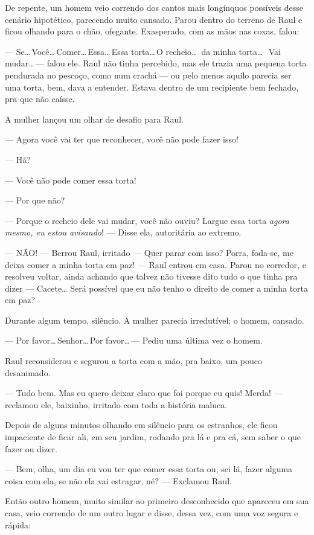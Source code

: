 De repente, um homem veio correndo dos cantos mais longínquos possíveis desse cenário hipotético, parecendo mui\-to cansado. Parou dentro do terreno de Raul e ficou olhando para o chão, ofegante. Exasperado, com as mãos nas coxas, falou:

--- Se\ldots\,Você\ldots\,Comer\ldots\,Essa\ldots\,Essa torta\ldots\,O recheio\ldots\ da minha torta\ldots\,\ Vai mudar\ldots\,--- falou ele. Raul não tinha percebido, mas ele trazia uma pequena torta pendurada no pescoço, como num crachá --- ou pelo menos aquilo parecia ser uma torta, bem, dava a entender. Estava dentro de um recipiente bem fechado, pra que não caísse.

A mulher lançou um olhar de desafio para Raul.

--- Agora você vai ter que reconhecer, você não pode fazer isso!

--- Hã?

--- Você não pode comer essa torta!

--- Por que não?

--- Porque o recheio dele vai mudar, você não ouviu? Largue essa torta \emph{agora mesmo, eu estou avisando}! --- Disse ela, autoritária ao extremo.

--- NÃO! --- Berrou Raul, irritado --- Quer parar com isso? Porra, foda-se, me deixa comer a minha torta em paz! --- Raul entrou em casa. Parou no corredor, e resolveu voltar, ainda achando que talvez não tivesse dito tudo o que tinha pra dizer --- Cacete… Será possível que eu não tenho o direito de comer a minha torta em paz?

Durante algum tempo, silêncio. A mulher parecia irredutível; o homem, cansado.

--- Por favor\ldots\,Senhor\ldots\,Por favor\ldots\,--- Pediu uma última vez o homem.

Raul reconsiderou e segurou a torta com a mão, pra baixo, um pouco desanimado.

--- Tudo bem. Mas eu quero deixar claro que foi porque eu quis! Merda! --- reclamou ele, baixinho, irritado com toda a história maluca.

Depois de alguns minutos olhando em silêncio para os estranhos, ele ficou impaciente de ficar ali, em seu jardim, rodando pra lá e pra cá, sem saber o que fazer ou dizer.

--- Bem, olha, um dia eu vou ter que comer essa torta ou, sei lá, fazer alguma coisa com ela, se não ela vai estragar, né? --- Exclamou Raul.

Então outro homem, muito similar ao primeiro desconhecido que apareceu em sua casa, veio correndo de um outro lugar e disse, dessa vez, com uma voz segura e rápida:

